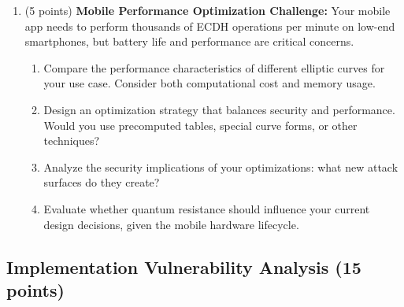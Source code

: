 \documentclass[10pt,a4paper,american]{exam}
\begin{document}
\begin{enumerate}
	\item (5 points) \textbf{Mobile Performance Optimization Challenge:}
	      Your mobile app needs to perform thousands of ECDH operations per minute on low-end smartphones, but battery life and performance are critical concerns.
	      \begin{enumerate}
		      \item Compare the performance characteristics of different elliptic curves for your use case. Consider both computational cost and memory usage.
		      \item Design an optimization strategy that balances security and performance. Would you use precomputed tables, special curve forms, or other techniques?
		      \item Analyze the security implications of your optimizations: what new attack surfaces do they create?
		      \item Evaluate whether quantum resistance should influence your current design decisions, given the mobile hardware lifecycle.
	      \end{enumerate}
\end{enumerate}

\subsection{Implementation Vulnerability Analysis (15 points)}
\end{document}
